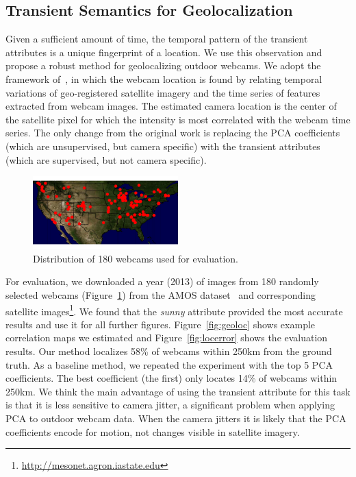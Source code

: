 \documentclass[10pt,twocolumn,letterpaper]{article}
\newcommand{\figref}[1]{Figure~\ref{fig:#1}}
\begin{document}
\subsection{Transient Semantics for Geolocalization}

Given a sufficient amount of time, the temporal pattern of the
transient attributes is a unique fingerprint of a location. We use
this observation and propose a robust method for geolocalizing outdoor
webcams. We adopt the framework of~\cite{jacobs07geolocate}, in which
the webcam location is found by relating temporal variations of
geo-registered satellite imagery and the time series of features
extracted from webcam images. The estimated camera location is the
center of the satellite pixel for which the intensity is most
correlated with the webcam time series. The only change from the
original work is replacing the PCA coefficients (which are
unsupervised, but camera specific) with the transient attributes
(which are supervised, but not camera specific).

\begin{figure}
	\centering
		\includegraphics[width=0.5\textwidth, trim= 0mm 0mm 0mm 0mm]{figs/geoloc/webcam_dist}
		\caption{Distribution of 180 webcams used for evaluation.}
		\label{fig:webcamdist}
\end{figure}

For evaluation, we downloaded a year (2013) of images from 180
randomly selected webcams (\figref{webcamdist}) from the AMOS
dataset~\cite{jacobs07amos} and corresponding satellite
images\footnote{\url{http://mesonet.agron.iastate.edu}}.  We found
that the \textit{sunny} attribute provided the most accurate results
and use it for all further figures. \figref{geoloc} shows example 
correlation maps we estimated and \figref{locerror}
shows the evaluation results. Our method localizes 58\% of webcams
within 250km from the ground truth. As a baseline method, we repeated
the experiment with the top 5 PCA coefficients. The best coefficient
(the first) only locates 14\% of webcams within 250km. We think
the main advantage of using the transient attribute for this task is
that it is less sensitive to camera jitter, a significant problem when
applying PCA to outdoor webcam data. When the camera jitters it is
likely that the PCA coefficients encode for motion, not changes
visible in satellite imagery.
\end{document}
